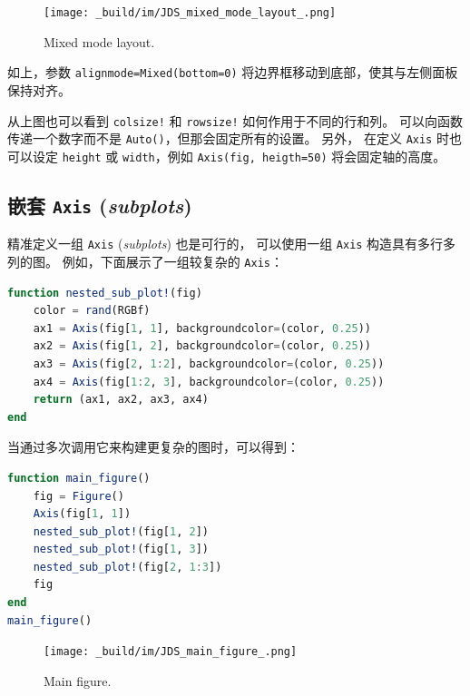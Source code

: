 \documentclass[
  notoc %
]{tufte-book}
\newcommand{\passthrough}[1]{#1}
\begin{document}
\begin{figure}
\hypertarget{fig:mixed_mode_layout}{%
\centering
\texttt{[image: \_build/im/JDS\_mixed\_mode\_layout\_.png]}
\caption{Mixed mode layout.}\label{fig:mixed_mode_layout}
}
\end{figure}

如上，参数 \passthrough{\lstinline!alignmode=Mixed(bottom=0)!}
将边界框移动到底部，使其与左侧面板保持对齐。

从上图也可以看到 \passthrough{\lstinline"colsize!"} 和
\passthrough{\lstinline"rowsize!"} 如何作用于不同的行和列。
可以向函数传递一个数字而不是
\passthrough{\lstinline!Auto()!}，但那会固定所有的设置。 另外， 在定义
\passthrough{\lstinline!Axis!} 时也可以设定
\passthrough{\lstinline!height!} 或
\passthrough{\lstinline!width!}，例如
\passthrough{\lstinline!Axis(fig, heigth=50)!} 将会固定轴的高度。

\hypertarget{ux5d4cux5957-axis-subplots}{%
\subsection{\texorpdfstring{嵌套 \texttt{Axis}
(\emph{subplots})}{嵌套 Axis (subplots)}}\label{ux5d4cux5957-axis-subplots}}

精准定义一组 \passthrough{\lstinline!Axis!} (\emph{subplots})
也是可行的， 可以使用一组 \passthrough{\lstinline!Axis!}
构造具有多行多列的图。 例如，下面展示了一组较复杂的
\passthrough{\lstinline!Axis!}：

\begin{lstlisting}[language=Julia]
function nested_sub_plot!(fig)
    color = rand(RGBf)
    ax1 = Axis(fig[1, 1], backgroundcolor=(color, 0.25))
    ax2 = Axis(fig[1, 2], backgroundcolor=(color, 0.25))
    ax3 = Axis(fig[2, 1:2], backgroundcolor=(color, 0.25))
    ax4 = Axis(fig[1:2, 3], backgroundcolor=(color, 0.25))
    return (ax1, ax2, ax3, ax4)
end
\end{lstlisting}

当通过多次调用它来构建更复杂的图时，可以得到：

\begin{lstlisting}[language=Julia]
function main_figure()
    fig = Figure()
    Axis(fig[1, 1])
    nested_sub_plot!(fig[1, 2])
    nested_sub_plot!(fig[1, 3])
    nested_sub_plot!(fig[2, 1:3])
    fig
end
main_figure()
\end{lstlisting}

\begin{figure}
\hypertarget{fig:main_figure}{%
\centering
\texttt{[image: \_build/im/JDS\_main\_figure\_.png]}
\caption{Main figure.}\label{fig:main_figure}
}
\end{figure}
\end{document}
